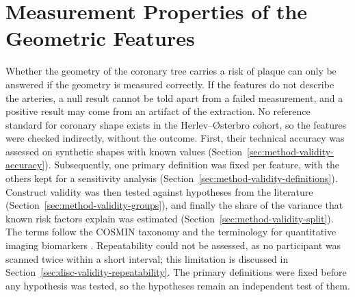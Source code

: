 \providecommand{\clarify}[1]{\textcolor{red}{\textbf{Clarification needed:} #1}}
\section{Measurement Properties of the Geometric Features}
\label{sec:method-validity}

Whether the geometry of the coronary tree carries a risk of plaque can only be answered if the geometry is measured correctly.
If the features do not describe the arteries, a null result cannot be told apart from a failed measurement, and a positive result may come from an artifact of the extraction.
No reference standard for coronary shape exists in the Herlev--{\O}sterbro cohort, so the features were checked indirectly, without the outcome.
First, their technical accuracy was assessed on synthetic shapes with known values (Section~\ref{sec:method-validity-accuracy}).
Subsequently, one primary definition was fixed per feature, with the others kept for a sensitivity analysis (Section~\ref{sec:method-validity-definitions}).
Construct validity was then tested against hypotheses from the literature (Section~\ref{sec:method-validity-groups}), and finally the share of the variance that known risk factors explain was estimated (Section~\ref{sec:method-validity-split}).
The terms follow the COSMIN taxonomy \cite{mokkink2010cosmin} and the terminology for quantitative imaging biomarkers \cite{kessler2015qib, raunig2015qib}.
Repeatability could not be assessed, as no participant was scanned twice within a short interval; this limitation is discussed in Section~\ref{sec:disc-validity-repeatability}.
The primary definitions were fixed before any hypothesis was tested, so the hypotheses remain an independent test of them.


